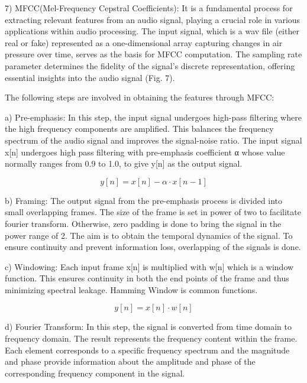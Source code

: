 \documentclass[conference]{IEEEtran}
\begin{document}
7) MFCC(Mel-Frequency Cepstral Coefficients): It is a fundamental process for extracting relevant features from an audio signal, playing a crucial role in various applications within audio processing. The input signal, which is a wav file (either real or fake) represented as a one-dimensional array capturing changes in air pressure over time, serves as the basis for MFCC computation. The sampling rate parameter determines the fidelity of the signal's discrete representation, offering essential insights into the audio signal (Fig. 7). 

The following steps are involved in obtaining the features through MFCC\cite{b16}:

a) Pre-emphasis: In this step, the input signal undergoes  high-pass filtering where the high frequency components are amplified. This balances the frequency spectrum of the audio signal and improves the signal-noise ratio. The input signal x[n] undergoes high pass filtering with pre-emphasis coefficient α whose value normally ranges from 0.9 to 1.0, to give y[n] as the output signal. 


\begin{equation}
y[n] = x[n] - \alpha \cdot x[n-1]
\end{equation} 


b) Framing: The output signal from the pre-emphasis process is divided into small overlapping frames. The size of the frame is set in power of two to facilitate fourier transform. Otherwise, zero padding is done to bring the signal in the power range of 2. The aim is to obtain the temporal dynamics of the signal. To ensure continuity and prevent information loss, overlapping of the signals is done. 

c) Windowing: Each input frame x[n] is multiplied with w[n] which is a window function. This ensures continuity in both the end points of the frame and thus minimizing spectral leakage. Hamming Window is common functions. 


\begin{equation}
y[n] = x[n] \cdot w[n]
\end{equation} 
 

d) Fourier Transform: In this step, the signal is converted from time domain to frequency domain. The result represents the frequency content within the frame. Each element corresponds to a specific frequency spectrum and the magnitude and phase provide information about the amplitude and phase of the corresponding frequency component in the signal. 
\end{document}
